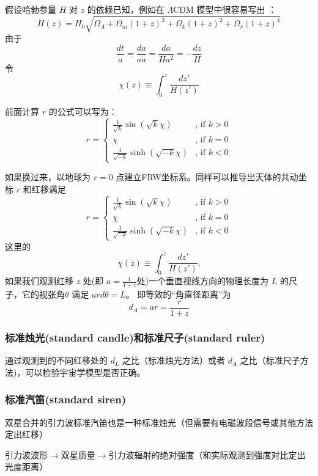 \documentclass[CJK,13pt]{beamer}
\begin{document}
\begin{frame}
  假设哈勃参量 $H$ 对 $z$ 的依赖已知，例如在 $\Lambda$CDM 模型中很容易写出 ：
  $$ H(z) = H_0\sqrt{\Omega_\Lambda + \Omega_m(1+z)^3  + \Omega_k(1+z)^2+\Omega_r(1+z)^4} $$
  由于
  $$\frac{dt}{a} = \frac{da}{a\dot a} = \frac{da }{Ha^2} = -\frac{dz}{H}$$
  令
  $$\chi(z) \equiv \int_0^z \frac{dz'}{H(z')} $$
  
  前面计算 $r$ 的公式可以写为：
  $$ r =   \left\{\begin{array}{ll}
  \frac{1}{\sqrt{k}}\sin{\left(\sqrt{k}\chi\right)} & \text{, if } k>0 \\
  \chi & \text{, if } k=0 \\
  \frac{1}{\sqrt{-k}}\sinh{\left(\sqrt{-k}\chi\right)} & \text{, if } k<0
  \end{array}\right.
  $$
  
\end{frame}



\begin{frame}
  如果换过来，以地球为 $r=0$ 点建立FRW坐标系。同样可以推导出天体的共动坐标 $r$ 和红移满足
  $$ r =   \left\{\begin{array}{ll}
  \frac{1}{\sqrt{k}}\sin{\left(\sqrt{k}\chi\right)} & \text{, if } k>0 \\
  \chi & \text{, if } k=0 \\
  \frac{1}{\sqrt{-k}}\sinh{\left(\sqrt{-k}\chi\right)} & \text{, if } k<0
  \end{array}\right.
  $$
  这里的  
  $$\chi(z) \equiv \int_0^z \frac{dz'}{H(z')}. $$
  如果我们观测红移 $z$ 处(即 $a=\frac{1}{1+z}$处)一个垂直视线方向的物理长度为 $L$ 的尺子，它的视张角$\theta$ 满足
  $ar d\theta = L$。
  即等效的“角直径距离”为
  $$ d_A = ar = \frac{r}{1+z}$$
\end{frame}



\begin{frame}
  \frametitle{标准烛光(standard candle)和标准尺子(standard ruler)}

  通过观测到的不同红移处的 $d_L$ 之比（标准烛光方法）或者 $d_A$ 之比（标准尺子方法)，可以检验宇宙学模型是否正确。
\end{frame}


\begin{frame}
  \frametitle{标准汽笛(standard siren)}
  双星合并的引力波标准汽笛也是一种标准烛光（但需要有电磁波段信号或其他方法定出红移）

  

  引力波波形$\rightarrow$双星质量$\rightarrow$引力波辐射的绝对强度（和实际观测到强度对比定出光度距离）
\end{frame}


    \ech
\end{document}
